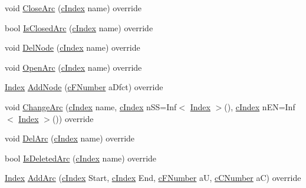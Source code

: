 \begin{DoxyCompactItemize}
\item 
void \mbox{\hyperlink{class_s_p_tree_a4a964ce79159307998f5acd0018d01b1}{Close\+Arc}} (\mbox{\hyperlink{class_m_c_f_class_a76aaabb20535c51a2752b93f6c38fe54}{c\+Index}} name) override
\item 
bool \mbox{\hyperlink{class_s_p_tree_a95d97fdf20e0075a8deda52f4925072a}{Is\+Closed\+Arc}} (\mbox{\hyperlink{class_m_c_f_class_a76aaabb20535c51a2752b93f6c38fe54}{c\+Index}} name) override
\item 
void \mbox{\hyperlink{class_s_p_tree_a61b3f4c0ad2cc61162e944abd43ebd0d}{Del\+Node}} (\mbox{\hyperlink{class_m_c_f_class_a76aaabb20535c51a2752b93f6c38fe54}{c\+Index}} name) override
\item 
void \mbox{\hyperlink{class_s_p_tree_af8adf5d3a1f9dfb9c2dd30c170663136}{Open\+Arc}} (\mbox{\hyperlink{class_m_c_f_class_a76aaabb20535c51a2752b93f6c38fe54}{c\+Index}} name) override
\item 
\mbox{\hyperlink{class_m_c_f_class_ad53d6229d7ec28555a9c9c2fd9abf773}{Index}} \mbox{\hyperlink{class_s_p_tree_a3b1944c7daf09b4e72cc2eeda39e335d}{Add\+Node}} (\mbox{\hyperlink{class_m_c_f_class_a11f747fbdff346237c8db4469d569994}{c\+F\+Number}} a\+Dfct) override
\item 
void \mbox{\hyperlink{class_s_p_tree_a23980253602d1183531a93a82d6e7f96}{Change\+Arc}} (\mbox{\hyperlink{class_m_c_f_class_a76aaabb20535c51a2752b93f6c38fe54}{c\+Index}} name, \mbox{\hyperlink{class_m_c_f_class_a76aaabb20535c51a2752b93f6c38fe54}{c\+Index}} n\+SS=Inf$<$ \mbox{\hyperlink{class_m_c_f_class_ad53d6229d7ec28555a9c9c2fd9abf773}{Index}} $>$(), \mbox{\hyperlink{class_m_c_f_class_a76aaabb20535c51a2752b93f6c38fe54}{c\+Index}} n\+EN=Inf$<$ \mbox{\hyperlink{class_m_c_f_class_ad53d6229d7ec28555a9c9c2fd9abf773}{Index}} $>$()) override
\item 
void \mbox{\hyperlink{class_s_p_tree_a3b6145c95b83f40a76d724eb2b92f80f}{Del\+Arc}} (\mbox{\hyperlink{class_m_c_f_class_a76aaabb20535c51a2752b93f6c38fe54}{c\+Index}} name) override
\item 
bool \mbox{\hyperlink{class_s_p_tree_a303cdd3554fa6aa53098d080262d1e4b}{Is\+Deleted\+Arc}} (\mbox{\hyperlink{class_m_c_f_class_a76aaabb20535c51a2752b93f6c38fe54}{c\+Index}} name) override
\item 
\mbox{\hyperlink{class_m_c_f_class_ad53d6229d7ec28555a9c9c2fd9abf773}{Index}} \mbox{\hyperlink{class_s_p_tree_a57e7641179f820974444701d4f179fb6}{Add\+Arc}} (\mbox{\hyperlink{class_m_c_f_class_a76aaabb20535c51a2752b93f6c38fe54}{c\+Index}} Start, \mbox{\hyperlink{class_m_c_f_class_a76aaabb20535c51a2752b93f6c38fe54}{c\+Index}} End, \mbox{\hyperlink{class_m_c_f_class_a11f747fbdff346237c8db4469d569994}{c\+F\+Number}} aU, \mbox{\hyperlink{class_m_c_f_class_a07dbefeeb08c3f63073622411893eb76}{c\+C\+Number}} aC) override

\end{DoxyCompactItemize}
